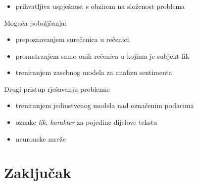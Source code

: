 \documentclass[t, xcolor={usenames,dvipsnames,svgnames,table}]{beamer}
\begin{document}
	\begin{frame}
		\frametitle{\secname}
		\begin{itemize}
			\item	prihvatljiva uspješnost s obzirom na složenost problema
		\end{itemize}
		
		\bigskip
		
		Moguća poboljšanja:
		\begin{itemize}
			\item	prepoznavanjem surečenica u rečenici
			\item 	promatranjem samo onih rečenica u kojima je subjekt lik
			\item 	treniranjem zasebnog modela za analizu sentimenta
		\end{itemize}
		
		\bigskip
		
		Drugi pristup rješavanju problema:
		\begin{itemize}
			\item	treniranjem jedinstvenog modela nad označenim podacima
			\item	oznake \textit{lik, karakter} za pojedine dijelove teksta
			\item 	neuronske mreže
		\end{itemize}
		
	\end{frame}


\section{Zaključak}
\end{document}
